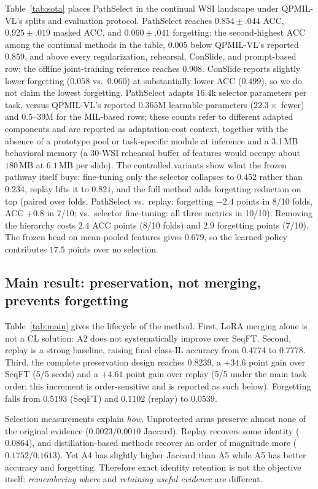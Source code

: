 \documentclass{article}
\begin{document}
Table~\ref{tab:sota} places PathSelect in the continual WSI landscape under QPMIL-VL's splits and evaluation protocol. PathSelect reaches $0.854{\pm}.044$ ACC, $0.925{\pm}.019$ masked ACC, and $0.060{\pm}.041$ forgetting: the second-highest ACC among the continual methods in the table, $0.005$ below QPMIL-VL's reported $0.859$, and above every regularization, rehearsal, ConSlide, and prompt-based row; the offline joint-training reference reaches $0.908$. ConSlide reports slightly lower forgetting ($0.058$ vs.\ $0.060$) at substantially lower ACC ($0.499$), so we do not claim the lowest forgetting. PathSelect adapts 16.4k selector parameters per task, versus QPMIL-VL's reported $0.365$M learnable parameters ($22.3\times$ fewer) and $0.5$--$39$M for the MIL-based rows; these counts refer to different adapted components and are reported as adaptation-cost context, together with the absence of a prototype pool or task-specific module at inference and a 3.1\,MB behavioral memory (a 30-WSI rehearsal buffer of features would occupy about $180$\,MB at $6.1$\,MB per slide). The controlled variants show what the frozen pathway itself buys: fine-tuning only the selector collapses to $0.452$ rather than $0.234$, replay lifts it to $0.821$, and the full method adds forgetting reduction on top (paired over folds, PathSelect vs.\ replay: forgetting $-2.4$ points in 8/10 folds, ACC $+0.8$ in 7/10; vs.\ selector fine-tuning: all three metrics in 10/10). Removing the hierarchy costs $2.4$ ACC points (8/10 folds) and $2.9$ forgetting points (7/10). The frozen head on mean-pooled features gives $0.679$, so the learned policy contributes $17.5$ points over no selection.

\subsection{Main result: preservation, not merging, prevents forgetting}

Table~\ref{tab:main} gives the lifecycle of the method.
First, LoRA merging alone is not a CL solution: A2 does not systematically improve over SeqFT.
Second, replay is a strong baseline, raising final class-IL accuracy from $0.4774$ to $0.7778$.
Third, the complete preservation design reaches $0.8239$, a $+34.6$ point gain over SeqFT (5/5 seeds) and a $+4.61$ point gain over replay (5/5 under the main task order; this increment is order-sensitive and is reported as such below).
Forgetting falls from $0.5193$ (SeqFT) and $0.1102$ (replay) to $0.0539$.

Selection measurements explain \emph{how}.
Unprotected arms preserve almost none of the original evidence ($0.0023$/$0.0010$ Jaccard).
Replay recovers some identity ($0.0864$), and distillation-based methods recover an order of magnitude more ($0.1752$/$0.1613$).
Yet A4 has slightly higher Jaccard than A5 while A5 has better accuracy and forgetting.
Therefore exact identity retention is not the objective itself: \emph{remembering where} and \emph{retaining useful evidence} are different.
\end{document}
